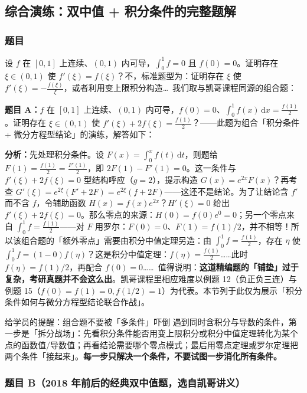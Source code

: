 \documentclass[a4paper]{article}
\begin{document}
\subsection{综合演练：双中值 + 积分条件的完整题解}

\subsubsection{题目}

设 $f$ 在 $[0,1]$ 上连续、$(0,1)$ 内可导，$\int_0^1 f=0$ 且 $f(0)=0$。证明存在 $\xi\in(0,1)$ 使 $f'(\xi)=f(\xi)$？不，标准题型为：证明存在 $\xi$ 使 $f'(\xi)=-\frac{f(\xi)}{\xi}$，或者利用变上限积分构造\ldots\ 我们取与凯哥课程同源的组合题：

\textbf{题目 A：}$f$ 在 $[0,1]$ 上连续、$(0,1)$ 内可导，$f(0)=0$、$\int_0^1 f(x)\,\mathrm{d}x=\frac{f(1)}2$。证明存在 $\xi\in(0,1)$ 使 $f'(\xi)+2f(\xi)=\frac{f(1)}{2}$？——此题为组合「积分条件 + 微分方程型结论」的演练，解答如下：

\textbf{分析：}先处理积分条件。设 $F(x)=\int_0^x f(t)\,\mathrm{d}t$，则题给 $F(1)=\frac{f(1)}2=\frac{F'(1)}2$，即 $2F(1)-F'(1)=0$。这一条件与 $f'(\xi)+2f(\xi)=0$ 型结构呼应（$g=2$），提示构造 $G(x)=e^{2x}F(x)$？再考查 $G'(\xi)=e^{2\xi}(F'+2F)=e^{2\xi}(f+2F)$——这还不是结论。为了让结论含 $f'$ 而不含 $f$，令辅助函数 $H(x)=f(x)e^{2x}$？$H'(\xi)=0$ 给出 $f'(\xi)+2f(\xi)=0$。那么零点的来源：$H(0)=f(0)e^0=0$；另一个零点来自 $\int_0^1 f=\frac{f(1)}2$——对 $F$ 用罗尔：$F(0)=0$、$F(1)=f(1)/2$，并不相等！所以该组合题的「额外零点」需要由积分中值定理另造：由 $\int_0^1 f=\frac{f(1)}2$，存在 $\eta$ 使 $\int_0^1 f=(1-0)f(\eta)$？这是积分中值定理：$f(\eta)=\frac{f(1)}2$……此时 $f(\eta)=f(1)/2$，再配合 $f(0)=0$…\ldots\ 值得说明：\textbf{这道精编题的「铺垫」过于复杂，考研真题并不会这么出}。凯哥课程里相应难度以例题 12（负正负三连）与例题 15（$f(0)=f(1)=0,f(1/2)=1$）为代表。本节列于此仅为展示「积分条件如何与微分方程型结论联合作战」。

\begin{warningbox}{给学员的提醒：组合题不要被「多条件」吓倒}
遇到同时含积分与导数的条件，第一步是「拆分战场」：先看积分条件能否用变上限积分或积分中值定理转化为某个点的函数值/导数值；再看结论需要哪个零点模式；最后用零点定理或罗尔定理把两个条件「接起来」。\textbf{每一步只解决一个条件，不要试图一步消化所有条件。}
\end{warningbox}

\subsubsection{题目 B（2018 年前后的经典双中值题，选自凯哥讲义）}
\end{document}
